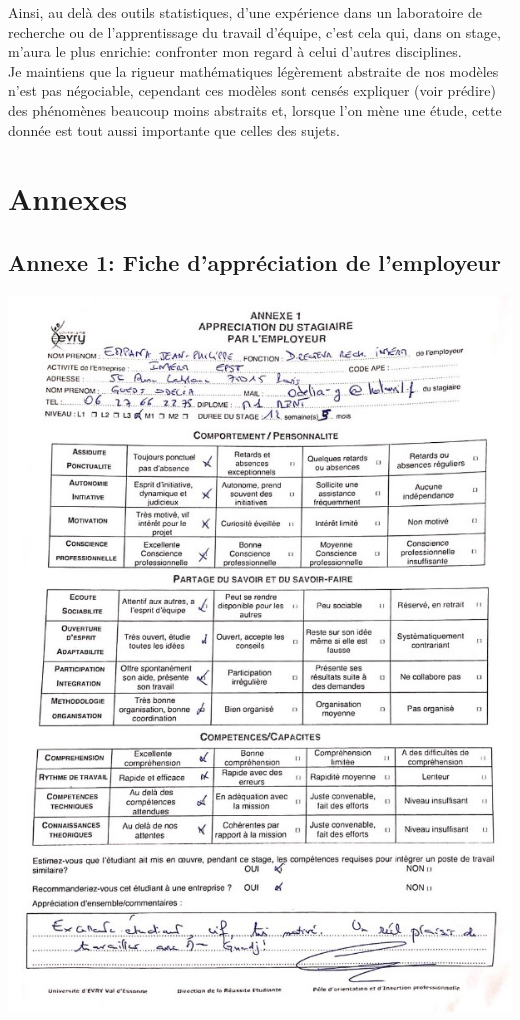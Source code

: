 \documentclass{book}
\begin{document}
\begin{center}
\bigskip
\noindent
Ainsi, au delà des outils statistiques, d'une expérience dans un laboratoire de recherche ou de l'apprentissage du travail d'équipe, c'est cela qui, dans on stage, m'aura le plus enrichie: confronter mon regard à celui d'autres disciplines.\\

\bigskip
\noindent
Je maintiens que la rigueur mathématiques légèrement abstraite de nos modèles n'est pas négociable, cependant ces modèles sont censés expliquer (voir prédire) des phénomènes beaucoup moins abstraits et, lorsque l'on mène une étude, cette donnée est tout aussi importante que celles des sujets.\\
\end{center}

\backmatter
\section{Annexes}


\subsection{Annexe 1: Fiche d'appréciation de l'employeur}
\includegraphics[scale=1.5]{appreciation_JPE.jpg}
\end{document}

